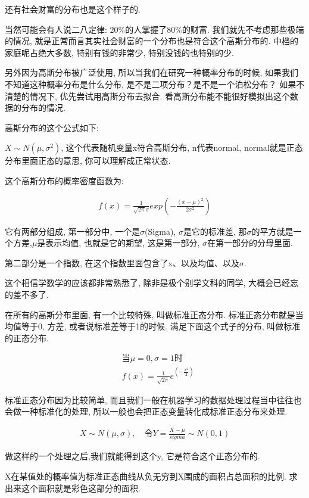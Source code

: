 还有社会财富的分布也是这个样子的. 

当然可能会有人说二八定律: $20\%$的人掌握了$80\%$的财富. 我们就先不考虑那些极端的情况, 就是正常而言其实社会财富的一个分布也是符合这个高斯分布的. 中档的家庭呢占绝大多数, 特别有钱的非常少, 特别没钱的也特别的少. 

另外因为高斯分布被广泛使用, 所以当我们在研究一种概率分布的时候, 如果我们不知道这种概率分布是什么分布, 是不是二项分布？是不是一个泊松分布？ 如果不清楚的情况下, 优先尝试用高斯分布去拟合. 看高斯分布能不能很好模拟出这个数据的分布的情况. 

高斯分布的这个公式如下: 

$X \sim N(\mu,\sigma ^2)$,  这个代表随机变量x符合高斯分布, n代表normal, normal就是正态分布里面正态的意思, 你可以理解成正常状态. 

这个高斯分布的概率密度函数为: 

\begin{align*}
  f(x)  = \frac{1}{\sqrt {2\pi}\sigma}exp(-\frac{(x-\mu)^2}{2\sigma^2})
\end{align*}

它有两部分组成, 第一部分中, 一个是$\sigma$(Sigma), $\sigma$是它的标准差, 那$\sigma$的平方就是一个方差,$\mu$是表示均值, 也就是它的期望, 这是第一部分, $\sigma$在第一部分的分母里面. 

第二部分是一个指数, 在这个指数里面包含了x、以及均值、以及$\sigma$. 

这个相信学数学的应该都非常熟悉了, 除非是极个别学文科的同学, 大概会已经忘的差不多了. 

在所有的高斯分布里面, 有一个比较特殊, 叫做标准正态分布. 标准正态分布就是当均值等于0, 方差, 或者说标准差等于1的时候. 满足下面这个式子的分布, 叫做标准的正态分布. 

\begin{align*}
  & \mbox{当}\mu = 0, \sigma = 1 \mbox{时} \\
  & f(x) = \frac{1}{\sqrt {2\pi}} e^{(-\frac{x^2}{2})}
\end{align*}

标准正态分布因为比较简单, 而且我们一般在机器学习的数据处理过程当中往往也会做一种标准化的处理, 所以一般也会把正态变量转化成标准正态分布来处理. 

\begin{align*}
  X \sim N(\mu, \sigma), \quad \mbox{令}Y= \frac{X-\mu}{sigma} \sim N(0,1)
\end{align*}

做这样的一个处理之后,我们就能得到这个y, 它是符合这个正态分布的. 

X在某值处的概率值为标准正态曲线从负无穷到X围成的面积占总面积的比例. 求出来这个面积就是彩色这部分的面积. 

